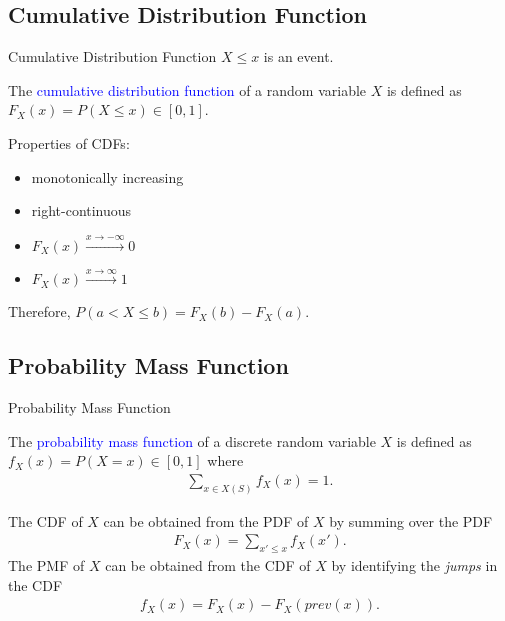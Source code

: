\documentclass{beamer}
\def\padding{\vspace{0.5cm}}
\def\spadding{\vspace{0.25cm}}
\def\b{\textcolor{blue}}
\begin{document}
\subsection{Cumulative Distribution Function}
\begin{frame}{Cumulative Distribution Function}
    $X \leq x$ is an event.\pause\par\padding
    \begin{definition}
        The \b{cumulative distribution function} of a random variable $X$ is defined as $F_X(x) = P(X \leq x) \in [0,1]$.
    \end{definition}\pause\par\spadding
    Properties of CDFs:\pause
    \begin{itemize}
        \item monotonically increasing\pause
        \item right-continuous\pause
        \item $F_X(x) \xrightarrow{x \to - \infty} 0$\pause
        \item $F_X(x) \xrightarrow{x \to \infty} 1$
    \end{itemize}\pause\padding
    Therefore, $P(a < X \leq b) = F_X(b) - F_X(a)$.
\end{frame}

\subsection{Probability Mass Function}
\begin{frame}{Probability Mass Function}
    \begin{definition}
        The \b{probability mass function} of a discrete random variable $X$ is defined as $f_X(x) = P(X = x) \in [0,1]$ where
        \begin{align*}
            \sum_{x \in X(S)} f_X(x) = 1.
        \end{align*}
    \end{definition}
\end{frame}

\begin{frame}
    The CDF of $X$ can be obtained from the PDF of $X$ by summing over the PDF
    \begin{align*}
        F_X(x) = \sum_{x' \leq x} f_X(x').
    \end{align*}\pause
    The PMF of $X$ can be obtained from the CDF of $X$ by identifying the \textit{jumps} in the CDF
    \begin{align*}
        f_X(x) = F_X(x) - F_X(prev(x)).
    \end{align*}
\end{frame}
\end{document}
